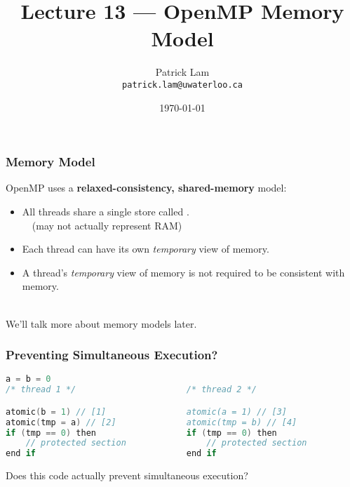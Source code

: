 

\title{Lecture 13 --- OpenMP Memory Model }

\author{Patrick Lam \\ \small \texttt{patrick.lam@uwaterloo.ca}}
\date{\today}




\begin{frame}
  \titlepage

 \end{frame}

\begin{frame}
  \frametitle{Memory Model}

  

  OpenMP uses a {\bf relaxed-consistency, shared-memory} model:

  \begin{itemize}
    \item All threads share a single store called
      .\\ ~~(may not actually represent RAM)\\[1em]
    \item Each thread can have its own {\it temporary} view of memory.\\[1em]
    \item A thread's {\it temporary} view of memory is not required to be
      consistent with memory.
  \end{itemize}~\\

  We'll talk more about memory models later.
  
\end{frame}

\begin{frame}[fragile]
  \frametitle{Preventing Simultaneous Execution?}

  \begin{lstlisting}[language=C,morekeywords={foreach,pragma,omp,parallel,single,nowait,task,untied,barrier,taskyield,mergeable,final,taskwait,critical}]
                    a = b = 0
/* thread 1 */                      /* thread 2 */

atomic(b = 1) // [1]                atomic(a = 1) // [3]
atomic(tmp = a) // [2]              atomic(tmp = b) // [4]
if (tmp == 0) then                  if (tmp == 0) then
    // protected section                // protected section
end if                              end if
  \end{lstlisting}

  
 Does this code actually prevent simultaneous execution?
  
\end{frame}

